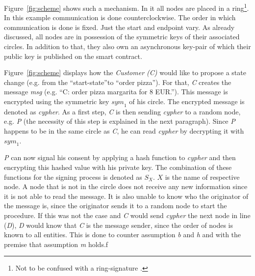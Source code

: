 \documentclass[runningheads]{llncs}
\newcommand{\comment}[1]{}
\newcommand{\ber}[1]{\textit{#1}}
\newcommand{\reffig}[1]{Figure~\ref{#1}}
\newcommand{\quotel}{``}
\newcommand{\quoter}{''}
\newcommand{\creditfootnote}[1]{}
\begin{document}
\reffig{fig:scheme} shows such a mechanism\creditfootnote{Credit: contract-icon in the \reffig{fig:scheme} made by Freepik (http://www.freepik.com) from www.flaticon.com}. In it all nodes are placed in a ring\footnote{Not to be confused with a ring-signature \cite{rivest2001leak}.}. In this example communication is done counterclockwise. The order in which communication is done is fixed. Just the start and endpoint vary. As already discussed, all nodes are in possession of the symmetric keys of their associated circles. In addition to that, they also own an asynchronous key-pair of which their public key is published on the smart contract.

\reffig{fig:scheme} displays how the \ber{Customer (C)} would like to propose a state change (e.g. from the \quotel start-state\quoter  to \quotel order pizza\quoter ). For that, \ber{C} creates the message \ber{msg} (e.g. \quotel C: order pizza margarita for 8 EUR.\quoter ). This message is encrypted using the symmetric key ${sym}_1$ of his circle. The encrypted message is denoted as \ber{cypher}. As a first step, \ber{C} is then sending \ber{cypher} to a random node, e.g. \ber{P} (the necessity of this step is explained in the next paragraph). Since \ber{P} happens to be in the same circle as \ber{C}, he can read \ber{cypher} by decrypting it with ${sym}_1$. 



\ber{P} can now signal his consent by applying a hash function to \ber{cypher} and then encrypting this hashed value with his private key. The combination of these functions for the signing process is denoted as $S_X$. $X$ is the name of respective node. A node that is not in the circle does not receive any new information since it is not able to read the message. It is also unable to know who the originator of the message is, since the originator sends it to a random node to start the procedure. If this was not the case and \ber{C} would send \ber{cypher} the next node in line (\ber{D}), \ber{D} would know that \ber{C} is the message sender, since the order of nodes is known to all entities. This is done to counter assumption \ber{b} and \ber{h} and with the premise that assumption \ber{m} holds.f

\comment{
Furthermore, a node will also not be able to know how many other nodes already \quotel agreed\quoter  to the message, because we \quotel nest\quoter  signatures instead of just appending them to a list. This way it is impossible to simply count the number of signatures, send together with \ber{cypher}. We do all of this to counter assumption \ber{b} and \ber{h} and with the premise that assumption \ber{m} holds.
}
\end{document}
